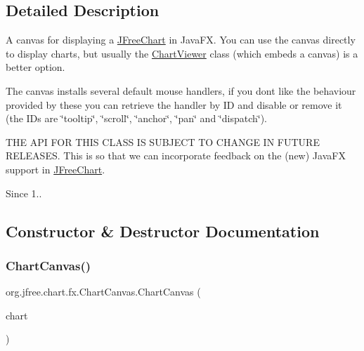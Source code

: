 \subsection{Detailed Description}
A canvas for displaying a \mbox{\hyperlink{classorg_1_1jfree_1_1chart_1_1_j_free_chart}{J\+Free\+Chart}} in Java\+FX. You can use the canvas directly to display charts, but usually the \mbox{\hyperlink{classorg_1_1jfree_1_1chart_1_1fx_1_1_chart_viewer}{Chart\+Viewer}} class (which embeds a canvas) is a better option. 

The canvas installs several default mouse handlers, if you don\textquotesingle{}t like the behaviour provided by these you can retrieve the handler by ID and disable or remove it (the I\+Ds are \char`\"{}tooltip\char`\"{}, \char`\"{}scroll\char`\"{}, \char`\"{}anchor\char`\"{}, \char`\"{}pan\char`\"{} and \char`\"{}dispatch\char`\"{}).

T\+HE A\+PI F\+OR T\+H\+IS C\+L\+A\+SS IS S\+U\+B\+J\+E\+CT TO C\+H\+A\+N\+GE IN F\+U\+T\+U\+RE R\+E\+L\+E\+A\+S\+ES. This is so that we can incorporate feedback on the (new) Java\+FX support in \mbox{\hyperlink{classorg_1_1jfree_1_1chart_1_1_j_free_chart}{J\+Free\+Chart}}.

\begin{DoxySince}{Since}
1.. 
\end{DoxySince}


\subsection{Constructor \& Destructor Documentation}
\mbox{\label{classorg_1_1jfree_1_1chart_1_1fx_1_1_chart_canvas_a64f73ef4f6721f456f707e33b37bd971}} 
\subsubsection{\texorpdfstring{Chart\+Canvas()}{ChartCanvas()}}
{\footnotesize\ttfamily org.\+jfree.\+chart.\+fx.\+Chart\+Canvas.\+Chart\+Canvas (\begin{DoxyParamCaption}\item[{\mbox{\hyperlink{classorg_1_1jfree_1_1chart_1_1_j_free_chart}{J\+Free\+Chart}}}]{chart }\end{DoxyParamCaption})}

